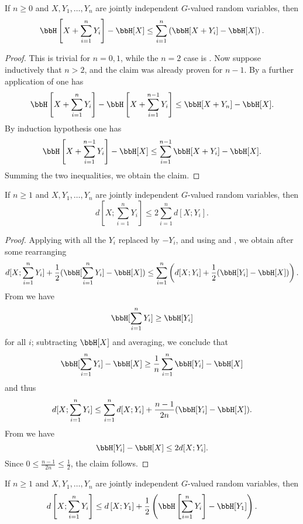 \begin{lemma}\label{klm-1}\leanok  If $n \geq 0$ and $X, Y_1, \dots, Y_n$ are jointly independent $G$-valued random variables, then
  $$\bbH\left[X + \sum_{i=1}^n Y_i\right] - \bbH[X] \leq \sum_{i=1}^n \left(\bbH[X+Y_i] - \bbH[X]\right).$$
\end{lemma}

\begin{proof}\leanok  This is trivial for $n=0,1$, while the $n=2$ case is .  Now suppose inductively that $n > 2$, and the claim was already proven for $n-1$.  By a further application of  one has
$$  \bbH\left[X + \sum_{i=1}^n Y_i\right] -  \bbH\left[X + \sum_{i=1}^{n-1} Y_i\right] \leq \bbH[X+Y_n] - \bbH[X].$$
By induction hypothesis one has
$$ \bbH\left[X + \sum_{i=1}^{n-1} Y_i\right] - \bbH[X] \leq \sum_{i=1}^{n-1} \bbH[X+Y_i] - \bbH[X].$$
Summing the two inequalities, we obtain the claim.
\end{proof}

\begin{lemma}\label{klm-2}\leanok  If $n \geq 1$ and $X, Y_1, \dots, Y_n$ are jointly independent $G$-valued random variables, then
  $$ d[X; \sum_{i=1}^n Y_i] \leq 2 \sum_{i=1}^n d[X; Y_i].$$
\end{lemma}

\begin{proof}\leanok
  Applying  with all the $Y_i$ replaced by $-Y_i$, and using  and , we obtain after some rearranging
$$ d[X; \sum_{i=1}^n Y_i] + \frac{1}{2} (\bbH[\sum_{i=1}^n Y_i] - \bbH[X]) \leq \sum_{i=1}^n \left(d[X;Y_i] + \frac{1}{2} (\bbH[Y_i] - \bbH[X])\right).$$
From  we have
$$ \bbH[\sum_{i=1}^n Y_i] \geq \bbH[Y_i]$$
for all $i$; subtracting $\bbH[X]$ and averaging, we conclude that
$$ \bbH[\sum_{i=1}^n Y_i] - \bbH[X] \geq \frac{1}{n} \sum_{i=1}^n \bbH[Y_i] - \bbH[X]$$
and thus
$$ d[X; \sum_{i=1}^n Y_i] \leq \sum_{i=1}^n d[X;Y_i] + \frac{n-1}{2n} (\bbH[Y_i] - \bbH[X]).$$
From  we have
$$ \bbH[Y_i] - \bbH[X] \leq 2 d[X;Y_i].$$
Since $0 \leq \frac{n-1}{2n} \leq \frac{1}{2}$, the claim follows.
\end{proof}

\begin{lemma}\label{klm-3}\leanok  If $n \geq 1$ and $X, Y_1, \dots, Y_n$ are jointly independent $G$-valued random variables, then
  $$d\left[X; \sum_{i=1}^n Y_i\right] \leq d\left[X; Y_1\right] + \frac{1}{2}\left(\bbH\left[ \sum_{i=1}^n Y_i\right] - \bbH[Y_1]\right).$$
\end{lemma}


